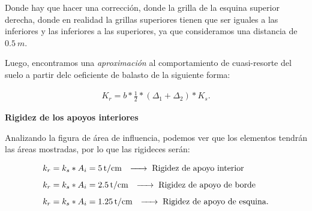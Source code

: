 \documentclass[../main.tex]{subfiles}
\begin{document}
\begin{figure}[ht]
\hfill
{}
\hfill
{}
\hfill
\end{figure}

Donde hay que hacer una corrección, donde la grilla de la esquina superior derecha,
donde en realidad la grillas superiores tienen que ser iguales a las inferiores
y las inferiores a las superiores, ya que consideramos una distancia de $\SI{0.5}{m}$.

Luego, encontramos una \textit{aproximación} al comportamiento de cuasi-resorte
del suelo a partir delc oeficiente de balasto de la siguiente forma:

\begin{align*}
  K_r = b * \frac{1}{2} * (\Delta_1 + \Delta_2 ) *K_s
.\end{align*}

\textbf{Rigidez de los apoyos interiores}

Analizando la figura de área de influencia, podemos ver que los elementos tendrán
las áreas mostradas, por lo que las rigideces serán:

\begin{align*}
  k_r &= k_s * A_i = \SI{5}{t / cm} \hspace{0.25cm} \xrightarrow{\hspace*{0.5cm}} \hspace{0.1cm} \text{Rigidez de apoyo interior} \\[5pt]
  k_r &= k_s * A_i = \SI{2.5}{t / cm} \hspace{0.25cm} \xrightarrow{\hspace*{0.5cm}} \hspace{0.1cm} \text{Rigidez de apoyo de borde}  \\[5pt]
  k_r &= k_s * A_i = \SI{1.25}{t /cm} \hspace{0.25cm} \xrightarrow{\hspace*{0.5cm}} \hspace{0.1cm} \text{Rigidez de apoyo de esquina} 
.\end{align*}
\end{document}

